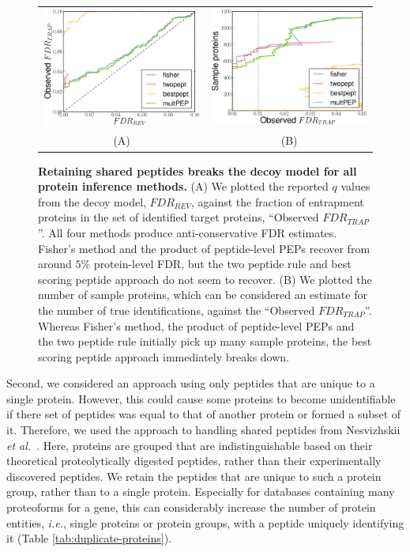 \documentclass{article}
\begin{document}
\begin{figure}[!htp]
\begin{center}
\begin{tabular}{cc} 
\includegraphics[width=0.45\linewidth]{./img/shared-pept-accuracy} &
\includegraphics[width=0.45\linewidth]{./img/shared-pept-performance}
\\
(A) & (B)
\end{tabular}
\caption{\label{fig:shared-accuracy}\textbf{Retaining shared peptides
breaks the decoy model for all protein inference methods.} (A) We
plotted the reported $q$ values from the decoy model, $FDR_{REV}$,
against the fraction of entrapment proteins in the set of identified
target proteins, ``Observed $FDR_{TRAP}$''. All four methods produce
anti-conservative FDR estimates. Fisher's method and the product of
peptide-level PEPs recover from around $5\%$ protein-level FDR, but
the two peptide rule and best scoring peptide approach do not seem to
recover. (B) We plotted the number of sample proteins, which can be
considered an estimate for the number of true identifications, against
the ``Observed $FDR_{TRAP}$''. Whereas Fisher's method, the product of
peptide-level PEPs and the two peptide rule initially pick up many
sample proteins, the best scoring peptide approach immediately breaks
down.}
\end{center}
\end{figure}

Second, we considered an approach using only peptides that are unique
to a single protein. However, this could cause some proteins to become
unidentifiable if there set of peptides was equal to that of another
protein or formed a subset of it. Therefore, we used the approach to
handling shared peptides from Nesvizhskii {\em et
al.}~\cite{nesvizhskii2003statistical}. Here, proteins are grouped
that are indistinguishable based on their theoretical proteolytically
digested peptides, rather than their experimentally discovered
peptides. We retain the peptides that are unique to such a protein
group, rather than to a single protein. Especially for databases
containing many proteoforms for a gene, this can considerably increase
the number of protein entities, {\em i.e.}, single proteins or protein
groups, with a peptide uniquely identifying it (Table
\ref{tab:duplicate-proteins}).
\end{document}
